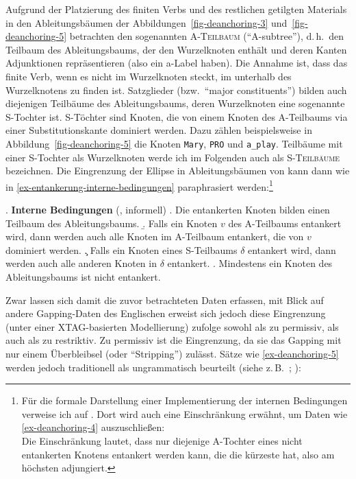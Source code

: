 Aufgrund der Platzierung des finiten Verbs und des restlichen getilgten Materials in den Ableitungsbäumen der Abbildungen~\ref{fig-deanchoring-3} und~\ref{fig-deanchoring-5} betrachten \cite{Lichte:Kallmeyer:10} den sogenannten \textsc{A-Teilbaum} ("`A-subtree"'), d.\,h.\ den Teilbaum des Ableitungsbaums, der den Wurzelknoten enthält und deren Kanten Adjunktionen repräsentieren (also ein {\sc a}-Label haben). Die Annahme ist, dass das finite Verb, wenn es nicht im Wurzelknoten steckt, im  unterhalb des Wurzelknotens zu finden ist. Satzglieder (bzw.\ "`major constituents"') bilden auch diejenigen Teilbäume des Ableitungsbaums, deren Wurzelknoten eine sogenannte S-Tochter ist. S-Töchter sind Knoten, die von einem Knoten des A-Teilbaums via einer Substitutionskante dominiert werden. Dazu zählen beispielsweise in Abbildung~\ref{fig-deanchoring-5} die Knoten {\tt Mary}, {\tt PRO} und {\tt a\_play}.  Teilbäume mit einer S-Tochter als Wurzelknoten werde ich im Folgenden auch als \textsc{S-Teilbäume} bezeichnen. Die Eingrenzung der Ellipse in Ableitungsbäumen von \cite{Lichte:Kallmeyer:10} kann dann wie in \ref{ex-entankerung-interne-bedingungen} paraphrasiert werden:\footnote{Für die formale Darstellung einer Implementierung der internen Bedingungen verweise ich auf \cite{Lichte:Kallmeyer:10}. Dort wird auch eine Einschränkung erwähnt, um Daten wie \ref{ex-deanchoring-4} auszuschlie\ss en:\\
Die Einschränkung lautet, dass nur diejenige A-Tochter eines nicht entankerten Knotens entankert werden kann, die die kürzeste  hat, also am höchsten adjungiert. 
} 

\ex. {\bf Interne Bedingungen} (\cite{Lichte:Kallmeyer:10}, informell) \label{ex-entankerung-interne-bedingungen}
\a. Die entankerten Knoten bilden einen Teilbaum des Ableitungsbaums.
\b. Falls ein Knoten $v$ des A-Teilbaums entankert wird, dann werden auch alle Knoten im A-Teilbaum entankert, die von $v$ dominiert werden.\label{ex-entankerung-interne-bedingungen-b}
\c. Falls ein Knoten eines S-Teilbaums $\delta$ entankert wird, dann werden auch alle anderen Knoten in $\delta$ entankert.
\e. Mindestens ein Knoten des Ableitungsbaums ist nicht entankert.

Zwar lassen sich damit die zuvor betrachteten Daten erfassen, mit Blick auf andere Gapping-Daten des Englischen erweist sich jedoch diese Eingrenzung (unter einer XTAG-basierten Modellierung) \cite{Lichte:Kallmeyer:10} zufolge sowohl als zu permissiv, als auch als zu restriktiv. Zu permissiv ist die Eingrenzung, da sie das Gapping mit nur einem Überbleibsel (oder "`Stripping"') zulässt. Sätze wie \ref{ex-deanchoring-5} werden jedoch traditionell als ungrammatisch beurteilt (siehe z.\,B.\ \citealt[27a]{Jackendoff:71}; \citealt[3]{Johnson:04}):

